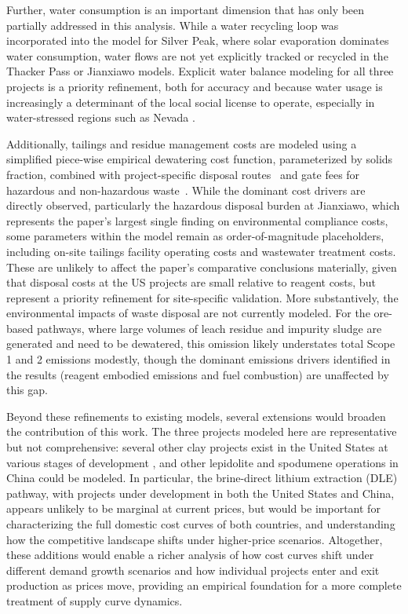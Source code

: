 Further, water consumption is an important dimension that has only been partially addressed in this analysis. While a water recycling loop was incorporated into the model for Silver Peak, where solar evaporation dominates water consumption, water flows are not yet explicitly tracked or recycled in the Thacker Pass or Jianxiawo models. Explicit water balance modeling for all three projects is a priority refinement, both for accuracy and because water usage is increasingly a determinant of the local social license to operate, especially in water-stressed regions such as Nevada \cite{sunRobustAssessmentsLithium2025, schombergExtendedLifeCycle2021}.

Additionally, tailings and residue management costs are modeled using a simplified piece-wise empirical dewatering cost function, parameterized by solids fraction, combined with project-specific disposal routes~\cite{sgscanadaincSK1300Technical2024,srkconsultingSECTechnicalReport2023a} and gate fees for hazardous and non-hazardous waste~\cite{nationaldevelopmentandreformcommission2024}. While the dominant cost drivers are directly observed, particularly the hazardous disposal burden at Jianxiawo, which represents the paper's largest single finding on environmental compliance costs, some parameters within the model remain as order-of-magnitude placeholders, including on-site tailings facility operating costs and wastewater treatment costs. These are unlikely to affect the paper's comparative conclusions materially, given that disposal costs at the US projects are small relative to reagent costs, but represent a priority refinement for site-specific validation. More substantively, the environmental impacts of waste disposal are not currently modeled. For the ore-based pathways, where large volumes of leach residue and impurity sludge are generated and need to be dewatered, this omission likely understates total Scope 1 and 2 emissions modestly, though the dominant emissions drivers identified in the results (reagent embodied emissions and fuel combustion) are unaffected by this gap.

Beyond these refinements to existing models, several extensions would broaden the contribution of this work. The three projects modeled here are representative but not comprehensive: several other clay projects exist in the United States at various stages of development \citep{wesselkaemperOptimizationProcessingCosts2025}, and other lepidolite and spodumene operations in China could be modeled. In particular, the brine-direct lithium extraction (DLE) pathway, with projects under development in both the United States and China, appears unlikely to be marginal at current prices, but would be important for characterizing the full domestic cost curves of both countries, and understanding how the competitive landscape shifts under higher-price scenarios. Altogether, these additions would enable a richer analysis of how cost curves shift under different demand growth scenarios and how individual projects enter and exit production as prices move, providing an empirical foundation for a more complete treatment of supply curve dynamics.

